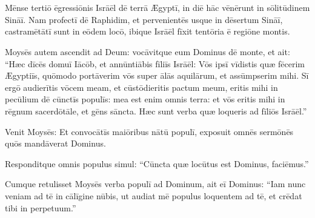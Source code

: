 \chapter{}


\thispagestyle{empty}

Mēnse tertiō ēgressiōnis Isrāēl dē
terrā Ægyptī, in diē hāc vēnērunt in sōlitūdinem Sināī. 
 Nam profectī dē Raphidim, et pervenientēs usque in dēsertum Sināī,
castramētātī sunt in eōdem locō, ibique
Isrāēl fīxit tentōria ē regiōne montis. 

Moysēs autem ascendit ad Deum: vocāvitque eum Dominus dē
monte, et ait: ``Hæc dīcēs domuī Iācōb, et
annūntiābis fīliīs Isrāēl: 
Vōs ipsī vīdistis quæ fēcerim
Ægyptiīs, quōmodo portāverim vōs super ālās aquilārum, et assūmpserim mihi.
Sī ergō audierītis vōcem meam, et cūstōdieritis pactum meum, eritis mihi in pecūlium dē
cūnctīs populīs: mea est enim omnis terra: 
et vōs eritis mihi in
rēgnum sacerdōtāle, et gēns
sāncta. Hæc sunt verba quæ loqueris ad fīliōs
Isrāēl.''

Venit Moysēs: Et convocātīs maiōribus nātū populī, exposuit
omnēs sermōnēs quōs mandāverat Dominus. 

Responditque omnis populus simul: ``Cūn\-cta quæ
locūtus est Dominus, faciēmus.''

Cumque retulisset Moysēs verba populī ad
Dominum, ait eī Dominus: ``Iam nunc veniam ad tē in
cālīgine nūbis, ut audiat mē populus loquentem ad tē, et
crēdat tibi in perpetuum.''



